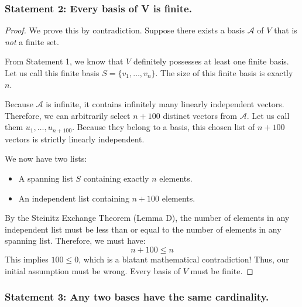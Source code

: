 \subsubsection*{Statement 2: Every basis of V is finite.}

\begin{proof}
We prove this by contradiction. Suppose there exists a basis $\mathcal{A}$ of $V$ that is \textit{not} a finite set. 

From Statement 1, we know that $V$ definitely possesses at least one finite basis. Let us call this finite basis $S = \{v_1, \dots, v_n\}$. The size of this finite basis is exactly $n$.

Because $\mathcal{A}$ is infinite, it contains infinitely many linearly independent vectors. Therefore, we can arbitrarily select $n + 100$ distinct vectors from $\mathcal{A}$. Let us call them $u_1, \dots, u_{n+100}$. 
Because they belong to a basis, this chosen list of $n+100$ vectors is strictly linearly independent. 

We now have two lists:
\begin{itemize}
    \item A spanning list $S$ containing exactly $n$ elements.
    \item An independent list containing $n+100$ elements.
\end{itemize}

By the Steinitz Exchange Theorem (Lemma D), the number of elements in any independent list must be less than or equal to the number of elements in any spanning list. Therefore, we must have:
\[
n + 100 \le n
\]
This implies $100 \le 0$, which is a blatant mathematical contradiction! Thus, our initial assumption must be wrong. Every basis of $V$ must be finite.
\end{proof}

\subsubsection*{Statement 3: Any two bases have the same cardinality.}

